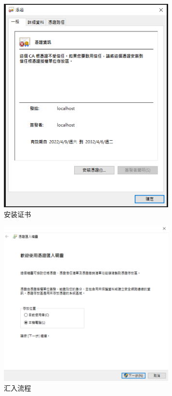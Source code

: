 \begin{figure}[htb]
\centering 
\includegraphics[width=0.80\textwidth]{img/ch1s2m7.png} 
\caption{安装证书}
\label{Test}
\end{figure}

\begin{figure}[htb]
\centering 
\includegraphics[width=0.80\textwidth]{img/ch1s2m8.png} 
\caption{汇入流程}
\label{Test}
\end{figure}

